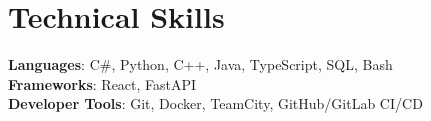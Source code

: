 \documentclass[letterpaper,10pt]{article}
\begin{document}
%
\section{Technical Skills}
    \begin{itemize}[leftmargin=0.15in, label={}]
        \small{\item{
            \textbf{Languages}{: C\#, Python, C++, Java, TypeScript, SQL, Bash} \\
            \textbf{Frameworks}{: React, FastAPI} \\
            \textbf{Developer Tools}{: Git, Docker, TeamCity, GitHub/GitLab CI/CD} \\
        }}
    \end{itemize}


\end{document}
